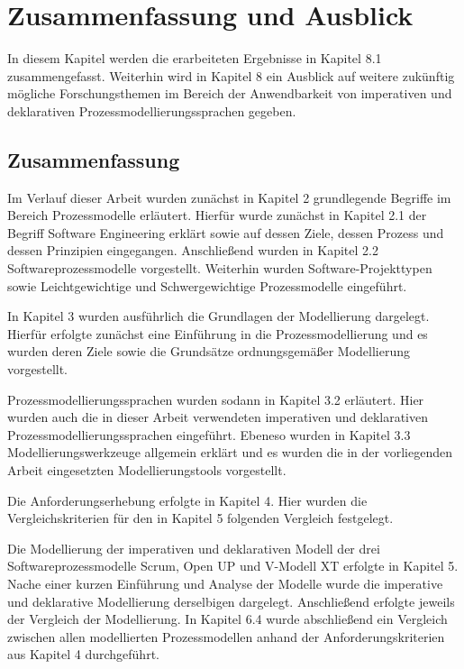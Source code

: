 \chapter{Zusammenfassung und Ausblick}\label{sec:chapter8}
 In diesem Kapitel werden die erarbeiteten Ergebnisse in Kapitel 8.1 zusammengefasst. Weiterhin wird in Kapitel 8 ein Ausblick auf weitere zukünftig mögliche Forschungsthemen im Bereich der Anwendbarkeit von imperativen und deklarativen Prozessmodellierungssprachen gegeben.

\section{Zusammenfassung}

Im Verlauf dieser Arbeit wurden zunächst in Kapitel 2 grundlegende Begriffe im Bereich Prozessmodelle erläutert. Hierfür wurde zunächst in Kapitel 2.1 der Begriff Software Engineering erklärt sowie auf dessen Ziele, dessen Prozess und dessen Prinzipien eingegangen.\newline
Anschließend wurden in Kapitel 2.2 Softwareprozessmodelle vorgestellt. Weiterhin wurden Software-Projekttypen sowie Leichtgewichtige und Schwergewichtige Prozessmodelle eingeführt.\newline

In Kapitel 3 wurden ausführlich die Grundlagen der Modellierung dargelegt. Hierfür erfolgte zunächst eine Einführung in die Prozessmodellierung und es wurden deren Ziele sowie die Grundsätze ordnungsgemäßer Modellierung vorgestellt.\newline

Prozessmodellierungssprachen wurden sodann in Kapitel 3.2 erläutert. Hier wurden auch die in dieser Arbeit verwendeten imperativen und deklarativen Prozessmodellierungssprachen eingeführt.\newline
Ebeneso wurden in Kapitel 3.3 Modellierungswerkzeuge allgemein erklärt und es wurden die in der vorliegenden Arbeit eingesetzten Modellierungstools vorgestellt.\newline

Die Anforderungserhebung erfolgte in Kapitel 4. Hier wurden die Vergleichskriterien für den in Kapitel 5 folgenden Vergleich  festgelegt.\newline

Die Modellierung der imperativen und deklarativen Modell der drei Softwareprozessmodelle Scrum, Open UP und V-Modell XT erfolgte in Kapitel 5. Nache einer kurzen Einführung und Analyse der Modelle wurde die imperative und deklarative Modellierung derselbigen dargelegt. Anschließend erfolgte jeweils der Vergleich der Modellierung. In Kapitel 6.4 wurde abschließend ein Vergleich zwischen allen modellierten Prozessmodellen anhand der Anforderungskriterien aus Kapitel 4 durchgeführt. \newline

